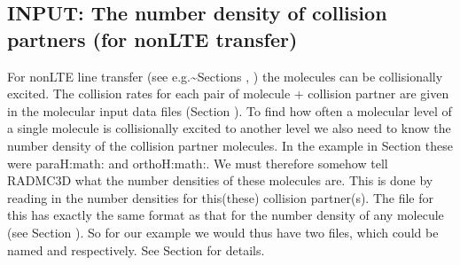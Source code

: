 \documentclass[letterpaper,10pt,english]{sphinxmanual}
\begin{document}
\subsection{INPUT: The number density of collision partners (for non\sphinxhyphen{}LTE transfer)}
\label{\detokenize{lineradtrans:input-the-number-density-of-collision-partners-for-non-lte-transfer}}\label{\detokenize{lineradtrans:sec-collpartner}}
For non\sphinxhyphen{}LTE line transfer (see e.g.\textasciitilde{}Sections {\hyperref[\detokenize{lineradtrans:sec-lvg}]{}},
{\hyperref[\detokenize{lineradtrans:sec-optthinpop}]{}}) the molecules can be collisionally excited. The collision
rates for each pair of molecule + collision partner are given in the molecular
input data files (Section {\hyperref[\detokenize{lineradtrans:sec-molecule-xxx-inp}]{}}). To find how often a
molecular level of a single molecule is collisionally excited to another level
we also need to know the number density of the collision partner molecules. In
the example in Section {\hyperref[\detokenize{lineradtrans:sec-molecule-xxx-inp}]{}} these were para\sphinxhyphen{}H:math:
and ortho\sphinxhyphen{}H:math:. We must therefore somehow tell RADMC\sphinxhyphen{}3D what the number
densities of these molecules are. This is done by reading in the number
densities for this(these) collision partner(s).  The file for this has exactly
the same format as that for the number density of any molecule (see Section
{\hyperref[\detokenize{lineradtrans:sec-mol-numdensity}]{}}). So for our example we would thus have two files,
which could be named  and 
respectively.  See Section {\hyperref[\detokenize{lineradtrans:sec-mol-numdensity}]{}} for details.
\end{document}
